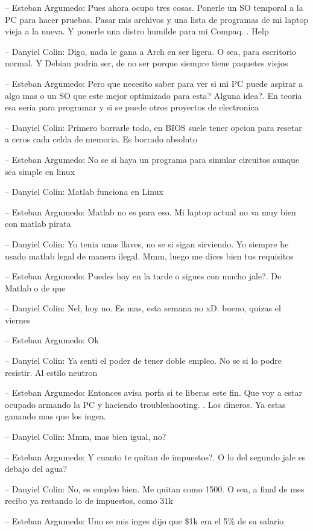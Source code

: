 -- Esteban Argumedo: Pues ahora ocupo tres cosas. Ponerle un SO temporal
a la PC para hacer pruebas. Pasar mis archivos y una lista de programas
de mi laptop vieja a la nueva. Y ponerle una distro humilde para mi
Compaq. . Help

-- Danyiel Colin: Digo, nada le gana a Arch en ser ligera. O sea, para
escritorio normal. Y Debian podria ser, de no ser porque siempre tiene
paquetes viejos

-- Esteban Argumedo: Pero que necesito saber para ver si mi PC puede
aspirar a algo mas o un SO que este mejor optimizado para esta? Alguna
idea?. En teoria esa seria para programar y si se puede otros proyectos
de electronica

-- Danyiel Colin: Primero borrarle todo, en BIOS suele tener opcion para
resetar a ceros cada celda de memoria. Es borrado absoluto

-- Esteban Argumedo: No se si haya un programa para simular circuitos
aunque sea simple en linux

-- Danyiel Colin: Matlab funciona en Linux

-- Esteban Argumedo: Matlab no es para eso. Mi laptop actual no va muy
bien con matlab pirata

-- Danyiel Colin: Yo tenia unas llaves, no se si sigan sirviendo. Yo
siempre he usado matlab legal de manera ilegal. Mmm, luego me dices bien
tus requisitos

-- Esteban Argumedo: Puedes hoy en la tarde o sigues con mucho jale?. De
Matlab o de que

-- Danyiel Colin: Nel, hoy no. Es mas, esta semana no xD. bueno, quizas
el viernes

-- Esteban Argumedo: Ok

-- Danyiel Colin: Ya senti el poder de tener doble empleo. No se si lo
podre resistir. Al estilo neutron

-- Esteban Argumedo: Entonces avisa porfa si te liberas este fin. Que
voy a estar ocupado armando la PC y haciendo troubleshooting. . Los
dineros. Ya estas ganando mas que los ingea.

-- Danyiel Colin: Mmm, mas bien igual, no?

-- Esteban Argumedo: Y cuanto te quitan de impuestos?. O lo del segundo
jale es debajo del agua?

-- Danyiel Colin: No, es empleo bien. Me quitan como 1500. O sea, a
final de mes recibo ya restando lo de impuestos, como 31k

-- Esteban Argumedo: Uno se mis inges dijo que \$1k era el 5\% de su
salario

